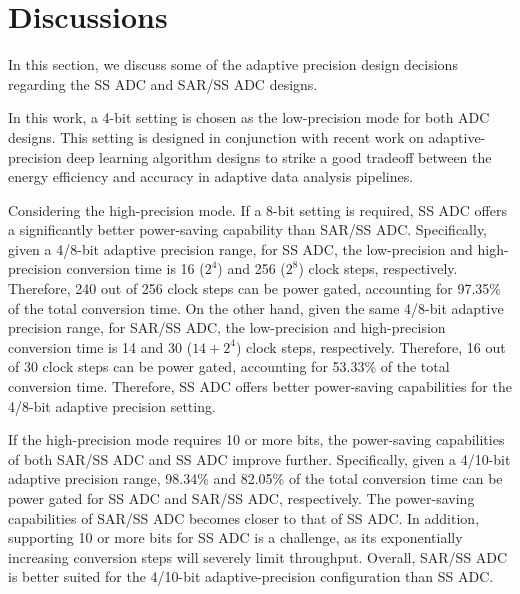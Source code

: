 \section{Discussions}\label{discussion}

In this section, we discuss some of the adaptive precision design decisions regarding the SS ADC and SAR/SS ADC designs. 


In this work, a 4-bit setting is chosen as the low-precision mode for both ADC designs. This 
setting is designed in conjunction with recent work on adaptive-precision deep learning algorithm 
designs to strike a good tradeoff between the energy efficiency and accuracy in adaptive data analysis 
pipelines. 


Considering the high-precision mode. If a 8-bit setting is required, SS ADC offers a significantly better power-saving
capability than SAR/SS ADC. Specifically, given a 4/8-bit adaptive precision range, for SS ADC, the 
low-precision and high-precision conversion time is 16 ($2^4$) and 256 ($2^8$) clock steps, respectively. Therefore, 
240 out of 256 clock steps can be power gated, accounting for 97.35\% of the total conversion time.  
On the other hand, given the same 4/8-bit adaptive precision range, for SAR/SS ADC, the low-precision and 
high-precision conversion time is 14 and 30 ($14+2^4$) clock steps, respectively. Therefore, 16 out of 30 clock steps 
can be power gated, accounting for 53.33\% of the total conversion time. Therefore, SS ADC offers better power-saving
capabilities for the 4/8-bit adaptive precision setting. 

If the high-precision mode requires 10 or more bits, the power-saving capabilities of both SAR/SS 
ADC and SS ADC improve further. Specifically, given a 4/10-bit adaptive precision range, 98.34\% and 82.05\% of the 
total conversion time can be power gated for SS ADC and SAR/SS ADC, respectively. The power-saving capabilities of 
SAR/SS ADC becomes closer to that of SS ADC. In addition, supporting 10 or more bits for SS ADC is a challenge, as 
its exponentially increasing conversion steps will severely limit throughput. 
Overall, SAR/SS ADC is better suited for the 4/10-bit adaptive-precision configuration than SS ADC.

